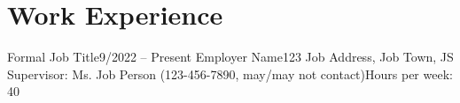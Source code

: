 \section{Work Experience}
  \resumeSubHeadingListStart

    \resumeSubheadingWork
      {Formal Job Title}{9/2022 -- Present}
      {Employer Name}{123 Job Address, Job Town, JS}
      {Supervisor: Ms. Job Person (123-456-7890, may/may not contact)}{Hours per week: 40}
      \resumeItemListStart
      \resumeItemListEnd
    

  \resumeSubHeadingListEnd
